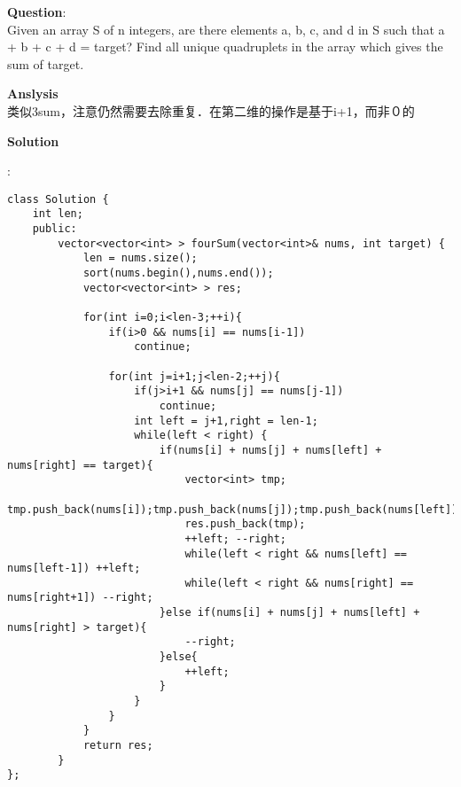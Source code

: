     
\begin{description}
    \item{\textbf{Question}}:\\%
		Given an array S of n integers, are there elements a, b, c, and d in S such that a + b + c + d = target? Find all unique quadruplets in the array which gives the sum of target.\\

    \item{\textbf{Anslysis}}\\
		类似3sum，注意仍然需要去除重复．在第二维的操作是基于i+1，而非０的\\

    \item{\textbf{Solution}}\\
	\item{} : \\
		\begin{lstlisting}
class Solution {
	int len;
	public:
		vector<vector<int> > fourSum(vector<int>& nums, int target) {
			len = nums.size();
			sort(nums.begin(),nums.end());
			vector<vector<int> > res;
			
			for(int i=0;i<len-3;++i){
				if(i>0 && nums[i] == nums[i-1]) 	
					continue;
					
				for(int j=i+1;j<len-2;++j){
					if(j>i+1 && nums[j] == nums[j-1])
						continue;
					int left = j+1,right = len-1;
					while(left < right) {
						if(nums[i] + nums[j] + nums[left] + nums[right] == target){
							vector<int> tmp;
							tmp.push_back(nums[i]);tmp.push_back(nums[j]);tmp.push_back(nums[left]);tmp.push_back(nums[right]);
							res.push_back(tmp);
							++left;	--right;
							while(left < right && nums[left] == nums[left-1]) ++left;
							while(left < right && nums[right] == nums[right+1]) --right;
						}else if(nums[i] + nums[j] + nums[left] + nums[right] > target){
							--right;
						}else{
							++left;
						}
					}
				}
			}
			return res;
		}
};
		\end{lstlisting}

\end{description}


